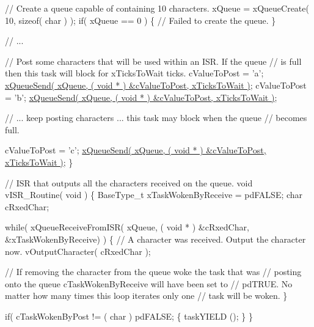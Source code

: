 \begin{DoxyPre}   // Create a queue capable of containing 10 characters.
   xQueue = xQueueCreate( 10, sizeof( char ) );
   if( xQueue == 0 )
   \{
    // Failed to create the queue.
   \}\end{DoxyPre}



\begin{DoxyPre}   // ...\end{DoxyPre}



\begin{DoxyPre}   // Post some characters that will be used within an ISR.  If the queue
   // is full then this task will block for xTicksToWait ticks.
   cValueToPost = 'a';
   \hyperlink{queue_8h_af7eb49d3249351176992950d9185abe9}{xQueueSend( xQueue, ( void * ) &cValueToPost, xTicksToWait )};
   cValueToPost = 'b';
   \hyperlink{queue_8h_af7eb49d3249351176992950d9185abe9}{xQueueSend( xQueue, ( void * ) &cValueToPost, xTicksToWait )};\end{DoxyPre}



\begin{DoxyPre}   // ... keep posting characters ... this task may block when the queue
   // becomes full.\end{DoxyPre}



\begin{DoxyPre}   cValueToPost = 'c';
   \hyperlink{queue_8h_af7eb49d3249351176992950d9185abe9}{xQueueSend( xQueue, ( void * ) &cValueToPost, xTicksToWait )};
\}\end{DoxyPre}



\begin{DoxyPre}// ISR that outputs all the characters received on the queue.
void vISR\_Routine( void )
\{
BaseType\_t xTaskWokenByReceive = pdFALSE;
char cRxedChar;\end{DoxyPre}



\begin{DoxyPre}   while( xQueueReceiveFromISR( xQueue, ( void * ) &cRxedChar, &xTaskWokenByReceive) )
   \{
    // A character was received.  Output the character now.
    vOutputCharacter( cRxedChar );\end{DoxyPre}



\begin{DoxyPre}    // If removing the character from the queue woke the task that was
    // posting onto the queue cTaskWokenByReceive will have been set to
    // pdTRUE.  No matter how many times this loop iterates only one
    // task will be woken.
   \}\end{DoxyPre}



\begin{DoxyPre}   if( cTaskWokenByPost != ( char ) pdFALSE;
   \{
    taskYIELD ();
   \}
\}
\end{DoxyPre}
 